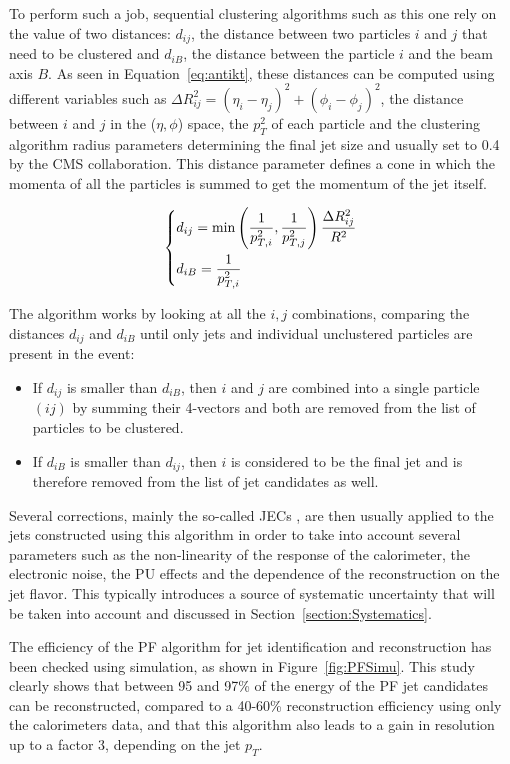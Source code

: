 \documentclass[a4paper, 10pt, openright]{report}
\begin{document}
To perform such a job, sequential clustering algorithms such as this one rely on the value of two distances: $d_{ij}$, the distance between two particles $i$ and $j$ that need to be clustered and $d_{iB}$, the distance between the particle $i$ and the beam axis $B$. As seen in Equation~\ref{eq:antikt}, these distances can be computed using different variables such as $\Delta R_{ij}^2 = (\eta_i - \eta_j)^2 + (\phi_i - \phi_j)^2$, the distance between $i$ and $j$ in the ($\eta, \phi$) space, the $p_T^2$ of each particle and the clustering algorithm radius parameters determining the final jet size and usually set to 0.4 by the \ac{CMS} collaboration. This distance parameter defines a cone in which the momenta of all the particles is summed to get the momentum of the jet itself.

\begin{equation}
\label{eq:antikt}
\begin{dcases}
d_{ij} = \text{min} \left (\frac{1}{p_{T, i}^2}, \frac{1}{p_{T, j}^2} \right ) \frac{\Delta R_{ij}^2}{R^2} \\
d_{iB} = \frac{1}{p_{T, i}^2}
\end{dcases}
\end{equation}

The algorithm works by looking at all the $i, j$ combinations, comparing the distances $d_{ij}$ and $d_{iB}$ until only jets and individual unclustered particles are present in the event: 
\begin{itemize}
\item If $d_{ij}$ is smaller than $d_{iB}$, then $i$ and $j$ are combined into a single particle $(ij)$ by summing their 4-vectors and both are removed from the list of particles to be clustered.
\item If $d_{iB}$ is smaller than $d_{ij}$, then $i$ is considered to be the final jet and is therefore removed from the list of jet candidates as well.
\end{itemize}

Several corrections, mainly the so-called \acp{JEC} \cite{JEC}, are then usually applied to the jets constructed using this algorithm in order to take into account several parameters such as the non-linearity of the response of the calorimeter, the electronic noise, the \ac{PU} effects and the dependence of the reconstruction on the jet flavor. This typically introduces a source of systematic uncertainty that will be taken into account and discussed in Section~\ref{section:Systematics}.

The efficiency of the \ac{PF} algorithm for jet identification and reconstruction has been checked using simulation, as shown in Figure~\ref{fig:PFSimu}. This study clearly shows that between 95 and 97\% of the energy of the \ac{PF} jet candidates can be reconstructed, compared to a 40-60\% reconstruction efficiency using only the calorimeters data, and that this algorithm also leads to a gain in resolution up to a factor 3, depending on the jet $p_T$.
\end{document}
